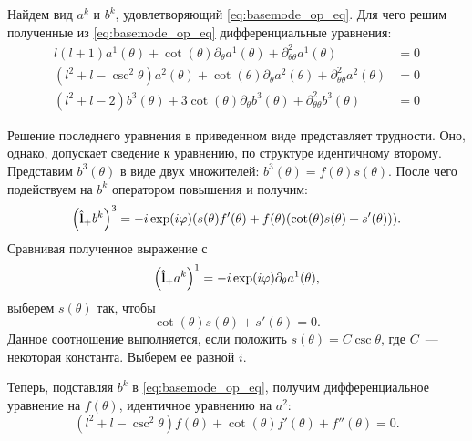 \documentclass[12pt,a4paper]{article}
\begin{document}
            Найдем вид $a^k$ и $b^k$, удовлетворяющий \autoref{eq:basemode_op_eq}. Для чего решим полученные из \autoref{eq:basemode_op_eq} дифференциальные уравнения:
            \begin{equation}\begin{aligned}
                l (l + 1) a^1(\theta)
                    + \cot(\theta) \partial_\theta a^1(\theta)
                    + \partial^2_{\theta\theta} a^1(\theta) &= 0 \\
                (l^2 + l - \csc^2\theta) a^2(\theta)
                    + \cot(\theta) \partial_\theta a^2(\theta)
                    + \partial^2_{\theta\theta} a^2(\theta) &= 0 \\
                (l^2 + l - 2) b^3(\theta)
                    + 3 \cot(\theta) \partial_\theta b^3(\theta)
                    + \partial^2_{\theta\theta} b^3(\theta) &= 0
            \end{aligned}\end{equation}

            Решение последнего уравнения в приведенном виде представляет трудности. Оно, однако, допускает сведение к уравнению, по структуре идентичному второму. Представим $b^3(\theta)$ в виде двух множителей: $b^3(\theta) = f(\theta) s(\theta)$. После чего подействуем на $b^k$ оператором повышения и получим:
            \begin{equation}
                \qty(\hat{\mathbf{l}}_{+} b^k)^3 = - i \exp(i \varphi) \qty(
                    s(\theta) f'(\theta) + f(\theta) \qty(\cot(\theta) s(\theta) + s'(\theta))
                ) .
            \end{equation}
            Сравнивая полученное выражение с
            \begin{equation}
                \qty(\hat{\mathbf{l}}_{+} a^k)^1 = - i \exp(i \varphi) \partial_\theta a^1(\theta) ,
            \end{equation}
            выберем $s(\theta)$ так, чтобы
            \begin{equation}
                \cot(\theta) s(\theta) + s'(\theta) = 0 .
            \end{equation}
            Данное соотношение выполняется, если положить $s(\theta) = C \csc\theta$, где $C$~--- некоторая константа. Выберем ее равной $i$.

            Теперь, подставляя $b^k$ в \autoref{eq:basemode_op_eq}, получим дифференциальное уравнение на $f(\theta)$, идентичное уравнению на $a^2$:
            \begin{equation}\label{eq:attached_legendre_pq}
                (l^2 + l - \csc^2\theta) f(\theta) + \cot(\theta) f'(\theta) + f''(\theta) = 0.
            \end{equation}
\end{document}
